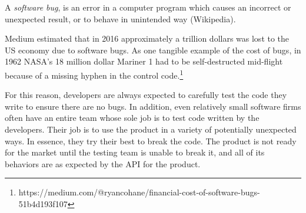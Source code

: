 \begin{definition}
A \emph{software bug}, is an error in a computer program which causes an incorrect or unexpected result, or to behave in unintended way (Wikipedia). 
\end{definition} 

Medium estimated that in 2016 approximately a trillion dollars was lost to the US economy due to software bugs. As one tangible example of the cost of bugs, in 1962 NASA's 18 million dollar Mariner 1 had to be self-destructed mid-flight because of a missing hyphen in the control code.\footnote{https://medium.com/@ryancohane/financial-cost-of-software-bugs-51b4d193f107}

For this reason, developers are always expected to carefully test the code they write to ensure there are no bugs. In addition, even relatively small software firms often have an entire team whose sole job is to test code written by the developers. Their job is to use the product in a variety of potentially unexpected ways. In essence, they try their best to break the code. The product is not ready for the market until the testing team is unable to break it, and all of its behaviors are as expected by the API for the product. 
